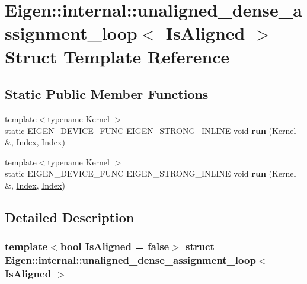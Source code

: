 \hypertarget{struct_eigen_1_1internal_1_1unaligned__dense__assignment__loop}{}\section{Eigen\+:\+:internal\+:\+:unaligned\+\_\+dense\+\_\+assignment\+\_\+loop$<$ Is\+Aligned $>$ Struct Template Reference}
\label{struct_eigen_1_1internal_1_1unaligned__dense__assignment__loop}
\subsection*{Static Public Member Functions}
\begin{DoxyCompactItemize}
\item 
\mbox{\label{struct_eigen_1_1internal_1_1unaligned__dense__assignment__loop_a72977a929d0f3ee1371cc39498e468d9}} 
{\footnotesize template$<$typename Kernel $>$ }\\static E\+I\+G\+E\+N\+\_\+\+D\+E\+V\+I\+C\+E\+\_\+\+F\+U\+NC E\+I\+G\+E\+N\+\_\+\+S\+T\+R\+O\+N\+G\+\_\+\+I\+N\+L\+I\+NE void {\bfseries run} (Kernel \&, \hyperlink{namespace_eigen_a62e77e0933482dafde8fe197d9a2cfde}{Index}, \hyperlink{namespace_eigen_a62e77e0933482dafde8fe197d9a2cfde}{Index})
\item 
\mbox{\label{struct_eigen_1_1internal_1_1unaligned__dense__assignment__loop_a72977a929d0f3ee1371cc39498e468d9}} 
{\footnotesize template$<$typename Kernel $>$ }\\static E\+I\+G\+E\+N\+\_\+\+D\+E\+V\+I\+C\+E\+\_\+\+F\+U\+NC E\+I\+G\+E\+N\+\_\+\+S\+T\+R\+O\+N\+G\+\_\+\+I\+N\+L\+I\+NE void {\bfseries run} (Kernel \&, \hyperlink{namespace_eigen_a62e77e0933482dafde8fe197d9a2cfde}{Index}, \hyperlink{namespace_eigen_a62e77e0933482dafde8fe197d9a2cfde}{Index})
\end{DoxyCompactItemize}


\subsection{Detailed Description}
\subsubsection*{template$<$bool Is\+Aligned = false$>$\newline
struct Eigen\+::internal\+::unaligned\+\_\+dense\+\_\+assignment\+\_\+loop$<$ Is\+Aligned $>$}



